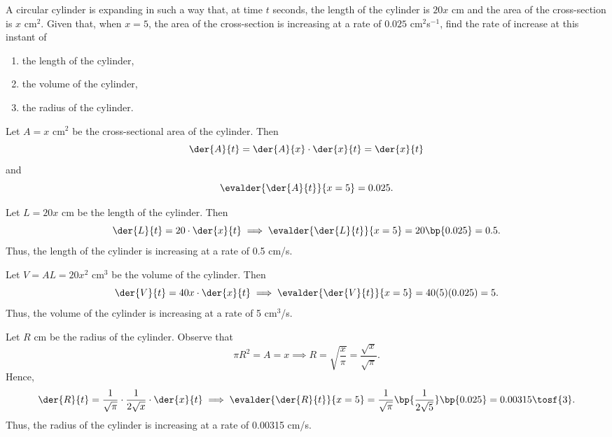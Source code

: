 \begin{problem}
    A circular cylinder is expanding in such a way that, at time $t$ seconds, the length of the cylinder is $20x$ cm and the area of the cross-section is $x$ cm$^2$. Given that, when $x=5$, the area of the cross-section is increasing at a rate of $0.025$ cm$^2$s$^{-1}$, find the rate of increase at this instant of
    \begin{enumerate}
        \item the length of the cylinder,
        \item the volume of the cylinder,
        \item the radius of the cylinder.
    \end{enumerate}
\end{problem}
\begin{solution}
    Let $A = x$ cm$^2$ be the cross-sectional area of the cylinder. Then \[\der{A}{t} = \der{A}{x} \cdot\der{x}{t} = \der{x}{t}\] and \[\evalder{\der{A}{t}}{x=5} = 0.025.\]

    \begin{ppart}
        Let $L = 20x$ cm be the length of the cylinder. Then \[\der{L}{t} = 20\cdot \der{x}{t} \implies \evalder{\der{L}{t}}{x=5} =  20\bp{0.025} = 0.5.\] Thus, the length of the cylinder is increasing at a rate of 0.5 cm/s.
    \end{ppart}
    \begin{ppart}
        Let $V = AL = 20x^2$ cm$^3$ be the volume of the cylinder. Then \[\der{V}{t} = 40x \cdot \der{x}{t} \implies \evalder{\der{V}{t}}{x=5} = 40(5)(0.025) = 5.\] Thus, the volume of the cylinder is increasing at a rate of 5 cm$^3$/s.
    \end{ppart}
    \begin{ppart}
        Let $R$ cm be the radius of the cylinder. Observe that \[\pi R^2 = A = x \implies R = \sqrt{\frac{x}\pi}= \frac{\sqrt{x}}{\sqrt\pi}.\] Hence, \[\der{R}{t} = \frac{1}{\sqrt\pi} \cdot \frac1{2\sqrt{x}} \cdot \der{x}{t} \implies \evalder{\der{R}{t}}{x=5} = \frac{1}{\sqrt\pi} \bp{\frac1{2\sqrt{5}}} \bp{0.025} = 0.00315 \tosf{3}.\] Thus, the radius of the cylinder is increasing at a rate of 0.00315 cm/s.
    \end{ppart}
\end{solution}

